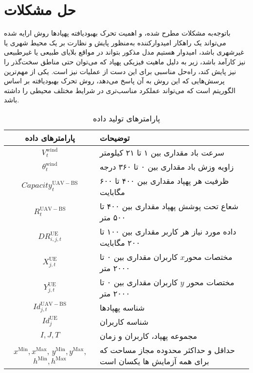 \section{حل مشکلات}
باتوجه‌به مشکلات مطرح شده، و اهمیت تحرک بهبودیافته پهپادها روش ارایه شده می‌تواند یک راهکار امیدوارکننده به‌منظور پایش و نظارت بر یک محیط شهری یا غیرشهری باشد، امیدوار هستیم مدل مذکور بتواند در مواقع بلایای طبیعی یا غیرطبیعی نیز کارآمد باشد، زیر به دلیل ماهیت فیزیکی پهپاد که می‌توان حتی مناطق سخت‌گذر را نیز پایش کند، راه‌حل مناسبی برای این دست از عملیات نیز است.
یکی از مهم‌ترین پرسش‌هایی که این روش به آن پاسخ می‌دهد، روش تحرک بهبودیافته بر اساس الگوریتم است که می‌تواند عملکرد مناسب‌تری در شرایط مختلف محیطی را داشته باشد.
%

\begin{table*}%
\centering
\caption{پارامترهای تولید داده}
\begin{tabular}{cp{9.5cm}}
\hline
پارامترهای داده & توضیحات \\ \hline
     $V_{t}^{\mathrm{wind}}$          &       سرعت باد مقداری بین ۱ تا ۲۱ کیلومتر        \\ 
     $\theta_{t}^{\mathrm{wind}}$     &        زاویه وزش باد مقداری بین ۰ تا ۳۶۰ درجه\\
     $Capacity_{t}^{\mathrm{UAV-BS}}$    &    ظرفیت هر پهپاد مقداری بین ۴۰۰ تا ۶۰۰ مگابایت\\
     $R_{t}^{\mathrm{UAV-BS}}$      &      شعاع تحت پوشش پهپاد مقداری بین ۴۰۰ تا ۵۰۰ متر\\
     $DR_{i,j,t}^{\mathrm{UE}}$       &      داده مورد نیاز هر کاربر مقداری بین ۱۰۰ تا ۲۰۰ مگابایت\\
     $X_{j,t}^{\mathrm{UE}}$          &      مختصات محور$x$ کاربران مقداری بین ۰ تا ۲۰۰۰ متر \\
     $Y_{j,t}^{\mathrm{UE}}$          &      مختصات محور $y$ کاربران مقداری بین ۰ تا ۲۰۰۰ متر\\
     $Id_{j,t}^{\mathrm{UAV-BS}}$        &      شناسه پهپاد‌ها\\
     $Id_{j}^{\mathrm{UE}}$           &      شناسه کاربران \\ 
     $I,J,T$                 &   مجموعه پهپاد، کاربران و زمان\\
     $x^{\mathrm{Min}},x^{\mathrm{Max}}$, $y^{\mathrm{Min}},y^{\mathrm{Max}}$, $h^{\mathrm{Min}},h^{\mathrm{Max}}$ &  حداقل و حداکثر محدوده مجاز مساحت که برای همه آزمایش ها یکسان است \\ \hline
\end{tabular}
\label{tab:gen}
\end{table*}

